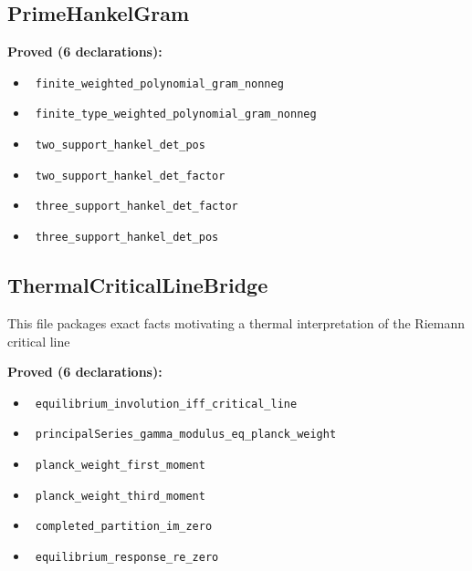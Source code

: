 \documentclass{report}
\theoremstyle{definition}
\begin{document}
\subsection{PrimeHankelGram}
\noindent\textbf{Proved (6 declarations):}
\begin{itemize}
  \item {}\leanok\ \texttt{finite\_weighted\_polynomial\_gram\_nonneg}
  \item {}\leanok\ \texttt{finite\_type\_weighted\_polynomial\_gram\_nonneg}
  \item {}\leanok\ \texttt{two\_support\_hankel\_det\_pos}
  \item {}\leanok\ \texttt{two\_support\_hankel\_det\_factor}
  \item {}\leanok\ \texttt{three\_support\_hankel\_det\_factor}
  \item {}\leanok\ \texttt{three\_support\_hankel\_det\_pos}
\end{itemize}

\subsection{ThermalCriticalLineBridge}
This file packages exact facts motivating a thermal interpretation of the Riemann critical line

\noindent\textbf{Proved (6 declarations):}
\begin{itemize}
  \item {}\leanok\ \texttt{equilibrium\_involution\_iff\_critical\_line}
  \item {}\leanok\ \texttt{principalSeries\_gamma\_modulus\_eq\_planck\_weight}
  \item {}\leanok\ \texttt{planck\_weight\_first\_moment}
  \item {}\leanok\ \texttt{planck\_weight\_third\_moment}
  \item {}\leanok\ \texttt{completed\_partition\_im\_zero}
  \item {}\leanok\ \texttt{equilibrium\_response\_re\_zero}
\end{itemize}
\end{document}
